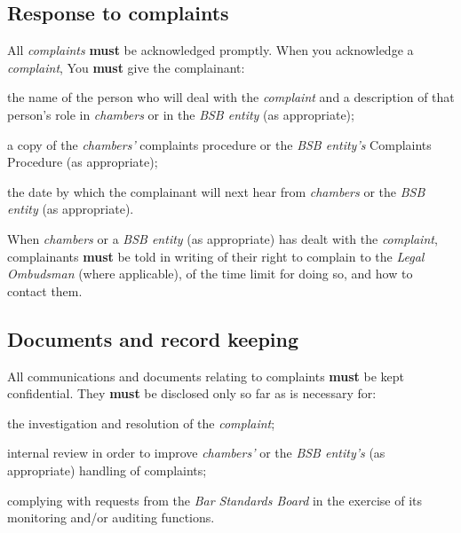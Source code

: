 \subsection{Response to complaints}


All \emph{complaints} \textcolor{myred}{\textbf{must}} be acknowledged promptly. When you
acknowledge a \emph{complaint}, You \textcolor{myred}{\textbf{must}} give the complainant:
\begin{numlist}\item the name of the person who will deal with the \emph{complaint} and a
description of that person's role in \emph{chambers} or in the \emph{BSB
entity} (as appropriate);
\item a copy of the \emph{chambers'} complaints procedure or the \emph{BSB
entity's} Complaints Procedure (as appropriate);
\item the date by which the complainant will next hear from \emph{chambers}
or the \emph{BSB entity} (as appropriate).
\end{numlist}

When \emph{chambers} or a \emph{BSB entity} (as appropriate) has dealt
with the \emph{complaint}, complainants \textcolor{myred}{\textbf{must}} be told in writing of their
right to complain to the \emph{Legal Ombudsman} (where applicable), of
the time limit for doing so, and how to contact them.

\subsection{Documents and record keeping}


All communications and documents relating to complaints \textcolor{myred}{\textbf{must}} be kept
confidential. They \textcolor{myred}{\textbf{must}} be disclosed only so far as is necessary for:
\begin{numlist}\item the investigation and resolution of the \emph{complaint};
\item internal review in order to improve \emph{chambers'} or the \emph{BSB
entity's} (as appropriate) handling of complaints;
\item complying with requests from the \emph{Bar Standards Board} in the
exercise of its monitoring and/or auditing functions.\end{numlist}

